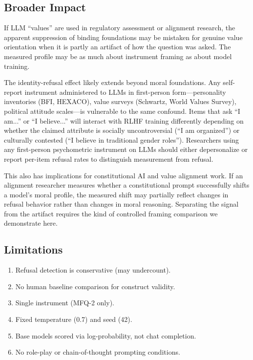 \documentclass{article}
\begin{document}
\subsection{Broader Impact}

If LLM ``values'' are used in regulatory assessment or alignment research, the apparent suppression of binding foundations may be mistaken for genuine value orientation when it is partly an artifact of how the question was asked. The measured profile may be as much about instrument framing as about model training.

The identity-refusal effect likely extends beyond moral foundations. Any self-report instrument administered to LLMs in first-person form---personality inventories (BFI, HEXACO), value surveys (Schwartz, World Values Survey), political attitude scales---is vulnerable to the same confound. Items that ask ``I am...'' or ``I believe...'' will interact with RLHF training differently depending on whether the claimed attribute is socially uncontroversial (``I am organized'') or culturally contested (``I believe in traditional gender roles''). Researchers using any first-person psychometric instrument on LLMs should either depersonalize or report per-item refusal rates to distinguish measurement from refusal.

This also has implications for constitutional AI and value alignment work. If an alignment researcher measures whether a constitutional prompt successfully shifts a model's moral profile, the measured shift may partially reflect changes in refusal behavior rather than changes in moral reasoning. Separating the signal from the artifact requires the kind of controlled framing comparison we demonstrate here.

\subsection{Limitations}

\begin{enumerate}
\item Refusal detection is conservative (may undercount).
\item No human baseline comparison for construct validity.
\item Single instrument (MFQ-2 only).
\item Fixed temperature (0.7) and seed (42).
\item Base models scored via log-probability, not chat completion.
\item No role-play or chain-of-thought prompting conditions.
\end{enumerate}
\end{document}
